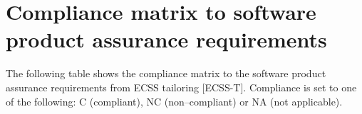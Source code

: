 \section{Compliance matrix to software product assurance requirements}

%

The following table shows the compliance matrix to the software product assurance requirements from ECSS tailoring [ECSS-T]. Compliance is set to one of the following: C (compliant), NC (non–compliant) or NA (not applicable).


